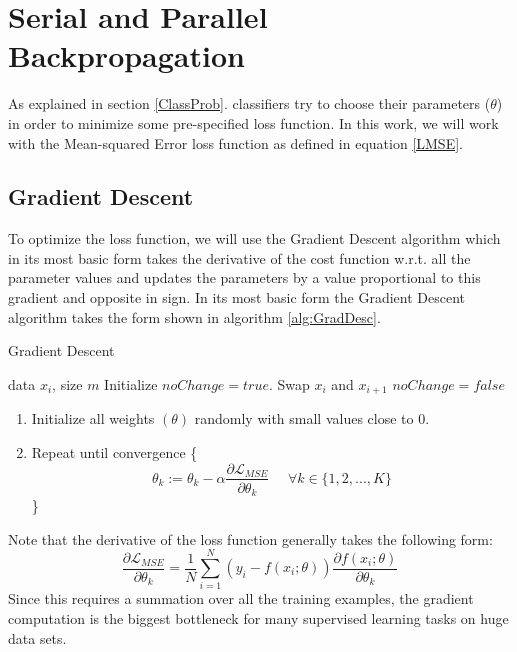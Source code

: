 \section{Serial and Parallel Backpropagation}
\label{BackProp}

As explained in section \ref{ClassProb}. classifiers try to choose their parameters ($\theta$) in order to minimize some pre-specified loss function.
In this work, we will work with the Mean-squared Error loss function as defined in equation \ref{LMSE}.

\subsection{Gradient Descent}
\label{GD}

To optimize the loss function, we will use the Gradient Descent algorithm which in its most basic form takes the derivative of the cost function w.r.t. all the parameter values and updates the parameters by a value proportional to this gradient and opposite in sign.
In its most basic form the Gradient Descent algorithm takes the form shown in algorithm \ref{alg:GradDesc}.
\begin{algorithm}[tb]
   \caption{Gradient Descent}
   \label{alg:GradDesc}
\begin{algorithmic}
    data $x_i$, size $m$
   \REPEAT
   \STATE Initialize $noChange = true$.
   \STATE Swap $x_i$ and $x_{i+1}$
   \STATE $noChange = false$
   \ENDIF
   \ENDFOR
\end{algorithmic}
\end{algorithm}

\begin{enumerate}
\item Initialize all weights $(\theta)$ randomly with small values close to 0.
\item Repeat until convergence \{
\begin{equation*}
\theta_k := \theta_k - \alpha \frac{\partial \mathcal{L}_{MSE}}{\partial \theta_k} \hspace{16pt} \forall k \in \{1,2,...,K\}
\end{equation*}
\}
\end{enumerate}
Note that the derivative of the loss function generally takes the following form:
\begin{equation*}
\frac{\partial \mathcal{L}_{MSE}}{\partial \theta_k} = \frac{1}{N} \sum_{i=1}^N ( y_i - f(x_i; \theta)) \frac{\partial f(x_i; \theta)}{\partial \theta_k}
\end{equation*}
Since this requires a summation over all the training examples, the gradient computation is the biggest bottleneck for many supervised learning tasks on huge data sets.

